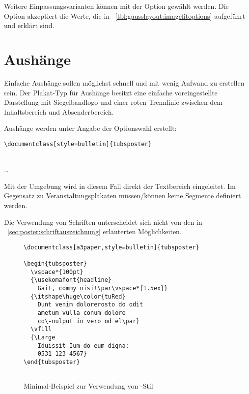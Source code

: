 Weitere Einpassungsvarianten können mit der Option 
gewählt werden.
Die Option  akzeptiert die Werte, die in
\tablename~\ref{tbl:gausslayout:imagefitoptions} aufgeführt und erklärt sind.

\clearpage
\section{Aushänge}

Einfache Aushänge sollen möglichst schnell und mit wenig Aufwand zu erstellen sein.
Der Plakat-Typ für Aushänge besitzt eine einfache voreingestellte Darstellung
mit Siegelbandlogo und einer roten Trennlinie zwischen dem Inhaltsbereich
und Absenderbereich.

Aushänge werden unter Angabe der Optionswahl
 erstellt:
\begin{lstlisting}
\documentclass[style=bulletin]{tubsposter}
\end{lstlisting}

\begin{Declaration}
  \\
  \quad\dots\\
\end{Declaration}

Mit der Umgebung  wird in diesem Fall direkt
der Textbereich eingeleitet.
Im Gegensatz zu Veranstaltungsplakaten müssen/können keine Segmente 
definiert werden.

Die Verwendung von Schriften unterscheidet sich nicht von den in
\chaptername~\ref{sec:poster:schriftauszeichnung} erläuterten 
Möglichkeiten.

\begin{figure}[!ht]
\begin{minipage}{0.65\textwidth}
\begin{lstlisting}
\documentclass[a3paper,style=bulletin]{tubsposter}

\begin{tubsposter}
  \vspace*{100pt}
  {\usekomafont{headline}
    Gait, commy nisi!\par\vspace*{1.5ex}}
  {\itshape\huge\color{tuRed}
    Dunt venim dolorerosto do odit
    ametum vulla conum dolore
    co\-nulput in vero od el\par}
  \vfill
  {\Large
    Iduissit Ium do eum digna:
    0531 123-4567}
\end{tubsposter}


\end{lstlisting}
\end{minipage}
\begin{minipage}{0.35\textwidth}
\end{minipage}
\caption{Minimal-Beispiel zur Verwendung von -Stil 
  }
\end{figure}


